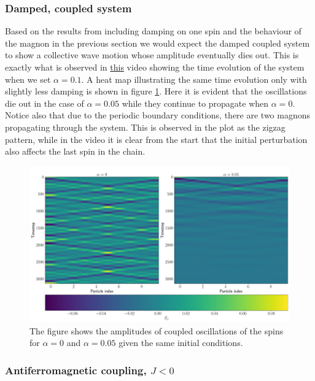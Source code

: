 \subsubsection{Damped, coupled system}

Based on the results from including damping on one spin and the behaviour of the magnon in the previous section we would expect the damped coupled system to show a collective wave motion whose amplitude eventually dies out. This is exactly what is observed in \href{https://folk.ntnu.no/sondrdl/spinwaves/coupled_spins_damped.mp4}{this} video showing the time evolution of the system when we set $\alpha = 0.1$. A heat map illustrating the same time evolution only with slightly less damping is shown in figure \ref{fig:damped_heat}. Here it is evident that the oscillations die out in the case of $\alpha = 0.05$ while they continue to propagate when $\alpha = 0$. Notice also that due to the periodic boundary conditions, there are two magnons propagating through the system. This is observed in the plot as the zigzag pattern, while in the video it is clear from the start that the initial perturbation also affects the last spin in the chain.

\begin{figure}[htb]
	\centering
	\includegraphics[width=\columnwidth]{../fig/damped_vs_undamped.pdf}
	\caption{The figure shows the amplitudes of coupled oscillations of the spins for $\alpha = 0$ and $\alpha = 0.05$ given the same initial conditions.}
	\label{fig:damped_heat}
\end{figure}

\subsubsection{Antiferromagnetic coupling, $J<0$}

